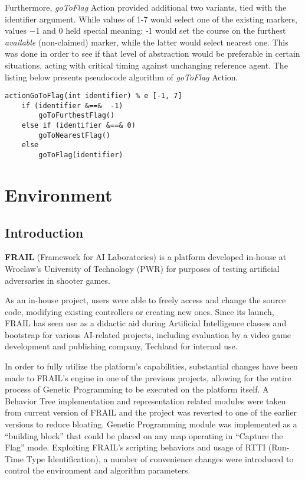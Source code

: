 Furthermore, \textit{goToFlag} Action provided additional two variants, tied with the identifier argument. While values of 1-7 would select one of the existing markers, values $-1$ and $0$ held special meaning: -1 would set the course on the furthest \textit{available} (non-claimed) marker, while the latter would select nearest one. This was done in order to see if that level of abstraction would be preferable in certain situations, acting with critical timing against unchanging reference agent. The listing below presents pseudocode algorithm of \textit{goToFlag} Action.

\begin{lstlisting}
actionGoToFlag(int identifier) % e [-1, 7]
    if (identifier &==&  -1)
        goToFurthestFlag()
    else if (identifier &==& 0)
        goToNearestFlag()
    else
        goToFlag(identifier)
\end{lstlisting}
\section{Environment}
\subsection{Introduction}
\textbf{FRAIL} (Framework for AI Laboratories) is a platform developed in-house at Wroclaw's University of Technology (PWR) for purposes of testing artificial adversaries in shooter games. \cite{frailweb}

As an in-house project, users were able to freely access and change the source code, modifying existing controllers or creating new ones. Since its launch, FRAIL has seen use as a didactic aid during Artificial Intelligence classes and bootstrap for various AI-related projects, including evaluation by a video game development and publishing company, Techland for internal use. %

In order to fully utilize the platform's capabilities, substantial changes have been made to FRAIL's engine in one of the previous projects, allowing for the entire process of Genetic Programming to be executed on the platform itself. A Behavior Tree implementation and representation related modules were taken from current version of FRAIL and the project was reverted to one of the earlier versions to reduce bloating. Genetic Programming module was implemented as a ``building block'' that could be placed on any map operating in ``Capture the Flag'' mode. Exploiting FRAIL's scripting behaviors and usage of RTTI (Run-Time Type Identification), a number of convenience changes were introduced to control the environment and algorithm parameters.
